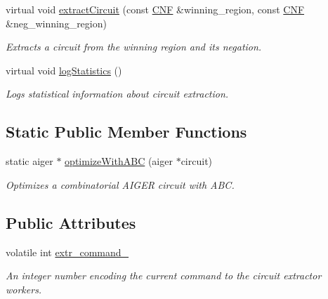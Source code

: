 \begin{DoxyCompactItemize}
virtual void \hyperlink{classCNFImplExtractor_a5e9694425af3f1a76d8b21ace3c435d9}{extract\-Circuit} (const \hyperlink{classCNF}{C\-N\-F} \&winning\-\_\-region, const \hyperlink{classCNF}{C\-N\-F} \&neg\-\_\-winning\-\_\-region)
\begin{DoxyCompactList}\small\item\em Extracts a circuit from the winning region and its negation. \end{DoxyCompactList}\item 
virtual void \hyperlink{classCNFImplExtractor_aae098749e201b22294a70f6e0a4a58f0}{log\-Statistics} ()
\begin{DoxyCompactList}\small\item\em Logs statistical information about circuit extraction. \end{DoxyCompactList}\end{DoxyCompactItemize}
\subsection*{Static Public Member Functions}
\begin{DoxyCompactItemize}
\item 
static aiger $\ast$ \hyperlink{classCNFImplExtractor_ad21828d816dfdbf672f6e595589ef6e7}{optimize\-With\-A\-B\-C} (aiger $\ast$circuit)
\begin{DoxyCompactList}\small\item\em Optimizes a combinatorial A\-I\-G\-E\-R circuit with A\-B\-C. \end{DoxyCompactList}\end{DoxyCompactItemize}
\subsection*{Public Attributes}
\begin{DoxyCompactItemize}
\item 
volatile int \hyperlink{classParExtractor_a57f6e0069d495f2b001fbf282278ed61}{extr\-\_\-command\-\_\-}
\begin{DoxyCompactList}\small\item\em An integer number encoding the current command to the circuit extractor workers. \end{DoxyCompactList}\end{DoxyCompactItemize}

